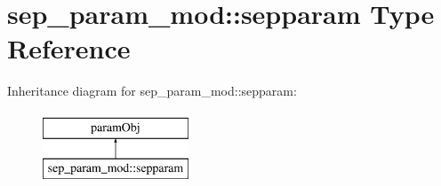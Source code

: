 \hypertarget{structsep__param__mod_1_1sepparam}{}\section{sep\+\_\+param\+\_\+mod\+:\+:sepparam Type Reference}
\label{structsep__param__mod_1_1sepparam}
Inheritance diagram for sep\+\_\+param\+\_\+mod\+:\+:sepparam\+:\begin{figure}[H]
\begin{center}
\leavevmode
\includegraphics[height=2.000000cm]{structsep__param__mod_1_1sepparam}
\end{center}
\end{figure}
